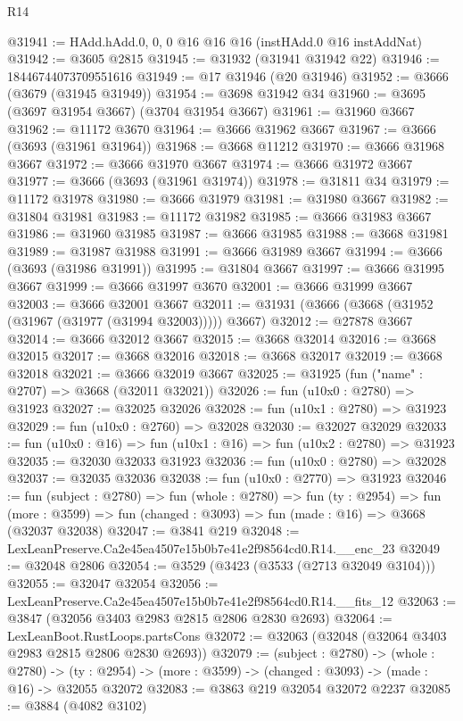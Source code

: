 \begin{lexlean}{R14}
\begin{coremodule}
@31941 := HAdd.hAdd.{0, 0, 0} @16 @16 @16 (instHAdd.{0} @16 instAddNat)
@31942 := @3605 @2815
@31945 := @31932 (@31941 @31942 @22)
@31946 := 18446744073709551616
@31949 := @17 @31946 (@20 @31946)
@31952 := @3666 (@3679 (@31945 @31949))
@31954 := @3698 @31942 @34
@31960 := @3695 (@3697 @31954 @3667) (@3704 @31954 @3667)
@31961 := @31960 @3667
@31962 := @11172 @3670
@31964 := @3666 @31962 @3667
@31967 := @3666 (@3693 (@31961 @31964))
@31968 := @3668 @11212
@31970 := @3666 @31968 @3667
@31972 := @3666 @31970 @3667
@31974 := @3666 @31972 @3667
@31977 := @3666 (@3693 (@31961 @31974))
@31978 := @31811 @34
@31979 := @11172 @31978
@31980 := @3666 @31979
@31981 := @31980 @3667
@31982 := @31804 @31981
@31983 := @11172 @31982
@31985 := @3666 @31983 @3667
@31986 := @31960 @31985
@31987 := @3666 @31985
@31988 := @3668 @31981
@31989 := @31987 @31988
@31991 := @3666 @31989 @3667
@31994 := @3666 (@3693 (@31986 @31991))
@31995 := @31804 @3667
@31997 := @3666 @31995 @3667
@31999 := @3666 @31997 @3670
@32001 := @3666 @31999 @3667
@32003 := @3666 @32001 @3667
@32011 := @31931 (@3666 (@3668 (@31952 (@31967 (@31977 (@31994 @32003))))) @3667)
@32012 := @27878 @3667
@32014 := @3666 @32012 @3667
@32015 := @3668 @32014
@32016 := @3668 @32015
@32017 := @3668 @32016
@32018 := @3668 @32017
@32019 := @3668 @32018
@32021 := @3666 @32019 @3667
@32025 := @31925 (fun ("name" : @2707) => @3668 (@32011 @32021))
@32026 := fun (u10x0 : @2780) => @31923
@32027 := @32025 @32026
@32028 := fun (u10x1 : @2780) => @31923
@32029 := fun (u10x0 : @2760) => @32028
@32030 := @32027 @32029
@32033 := fun (u10x0 : @16) => fun (u10x1 : @16) => fun (u10x2 : @2780) => @31923
@32035 := @32030 @32033 @31923
@32036 := fun (u10x0 : @2780) => @32028
@32037 := @32035 @32036
@32038 := fun (u10x0 : @2770) => @31923
@32046 := fun (subject : @2780) =>
  fun (whole : @2780) =>
  fun (ty : @2954) =>
  fun (more : @3599) => fun (changed : @3093) => fun (made : @16) => @3668 (@32037 @32038)
@32047 := @3841 @219
@32048 := LexLeanPreserve.Ca2e45ea4507e15b0b7e41e2f98564cd0.R14.__enc_23
@32049 := @32048 @2806
@32054 := @3529 (@3423 (@3533 (@2713 @32049 @3104)))
@32055 := @32047 @32054
@32056 := LexLeanPreserve.Ca2e45ea4507e15b0b7e41e2f98564cd0.R14.__fits_12
@32063 := @3847 (@32056 @3403 @2983 @2815 @2806 @2830 @2693)
@32064 := LexLeanBoot.RustLoops.partsCons
@32072 := @32063 (@32048 (@32064 @3403 @2983 @2815 @2806 @2830 @2693))
@32079 := (subject : @2780) ->
  (whole : @2780) ->
  (ty : @2954) -> (more : @3599) -> (changed : @3093) -> (made : @16) -> @32055 @32072
@32083 := @3863 @219 @32054 @32072 @2237
@32085 := @3884 (@4082 @3102)

\end{coremodule}
\end{lexlean}
